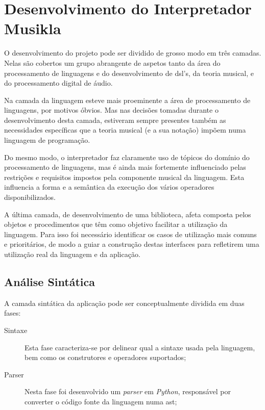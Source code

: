 \chapter{Desenvolvimento do Interpretador Musikla}
O desenvolvimento do projeto pode ser dividido de grosso modo em três camadas. Nelas são cobertos um grupo abrangente de aspetos tanto da área do processamento de linguagens e do desenvolvimento de \acrshort{dsl}'s, da teoria musical, e do processamento digital de áudio. 

Na camada da linguagem esteve mais proeminente a área de processamento de linguagens, por motivos óbvios. Mas nas decisões tomadas durante o desenvolvimento desta camada, estiveram sempre presentes também as necessidades específicas que a teoria musical (e a sua notação) impõem numa linguagem de programação.

Do mesmo modo, o interpretador faz claramente uso de tópicos do domínio do processamento de linguagens, mas é ainda mais fortemente influenciado pelas restrições  e requisitos impostos pela componente musical da linguagem. Esta influencia a forma e a semântica da execução dos vários operadores disponibilizados.

A última camada, de desenvolvimento de uma biblioteca, afeta composta pelos objetos e procedimentos que têm como objetivo facilitar a utilização da linguagem. Para isso foi necessário identificar os casos de utilização mais comuns e prioritários, de modo a guiar a construção destas interfaces para refletirem uma utilização real da linguagem e da aplicação.

\section{Análise Sintática}
A camada sintática da aplicação pode ser conceptualmente dividida em duas fases:
\begin{description}
    \item[Sintaxe] Esta fase caracteriza-se por delinear qual a sintaxe usada pela linguagem, bem como os construtores e operadores suportados;
    \item[Parser] Nesta fase foi desenvolvido um \textit{parser} em \textit{Python}, responsável por converter o código fonte da linguagem numa \acrfull{ast};
\end{description}


